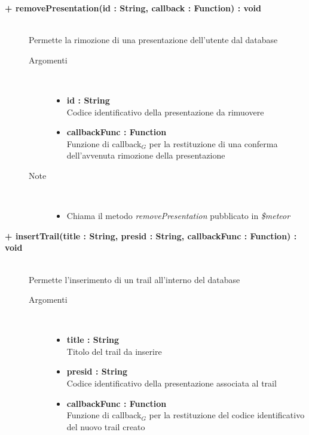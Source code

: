\begin{description}
	\begin{description}
		\item[\textbf{\color{blue}+ removePresentation(id : String, callback : Function) : void			}] \hfill \\
			Permette la rimozione di una presentazione dell'utente dal database
			
		\begin{description}
			\item[Argomenti] \hfill \\
				\begin{itemize}
					\item \textbf{id : String			} \hfill \\
					Codice identificativo della presentazione da rimuovere
					\item \textbf{callbackFunc : Function			} \hfill \\
					Funzione di callback$_G$ per la restituzione di una conferma dell'avvenuta rimozione della presentazione
					
				\end{itemize}
			\item[Note] \hfill \\
			\begin{itemize}
					\item Chiama il metodo \textit{removePresentation} pubblicato in \textit{\$meteor}
			\end{itemize}
		\end{description}
	\end{description}



	\begin{description}
		\item[\textbf{\color{blue}+ insertTrail(title : String, presid : String, callbackFunc : Function) : void			}] \hfill \\
			Permette l'inserimento di un trail all'interno del database
			
		\begin{description}
			\item[Argomenti] \hfill \\
				\begin{itemize}
					\item \textbf{title : String			} \hfill \\
					Titolo del trail da inserire
					\item \textbf{presid : String			} \hfill \\
					Codice identificativo della presentazione associata al trail
					\item \textbf{callbackFunc : Function			} \hfill \\
					Funzione di callback$_G$ per la restituzione del codice identificativo del nuovo trail creato
					

\end{itemize}
\end{description}
\end{description}
\end{description}
